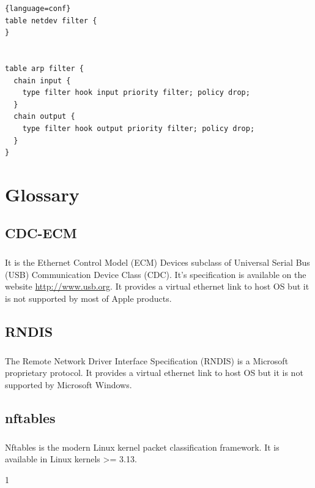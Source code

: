 \documentclass[mscthesis]{usiinfthesis}
\begin{document}
\begin{lstlisting}{language=conf}
table netdev filter {
}


table arp filter {
  chain input {
    type filter hook input priority filter; policy drop;
  }
  chain output {
    type filter hook output priority filter; policy drop;
  }
}
\end{lstlisting}

\backmatter

\chapter{Glossary} %
\section{CDC-ECM}\label{sec:CDC-ECM}
\paragraph{}
It is the Ethernet Control Model (ECM) Devices subclass of Universal Serial Bus (USB) Communication Device Class (CDC). It's specification is available on the website \url{http://www.usb.org}. It provides a virtual ethernet link to host OS but it is not supported by most of Apple products.

\section{RNDIS}\label{sec:RNDIS}
\paragraph{}
The Remote Network Driver Interface Specification (RNDIS) is a Microsoft proprietary protocol. It provides a virtual ethernet link to host OS but it is not supported by Microsoft Windows.

\section{nftables}\label{sec:nftables}
\paragraph{}
Nftables is the modern Linux kernel packet classification framework. It is available in Linux kernels >= 3.13.
%
%



1
\end{document}
